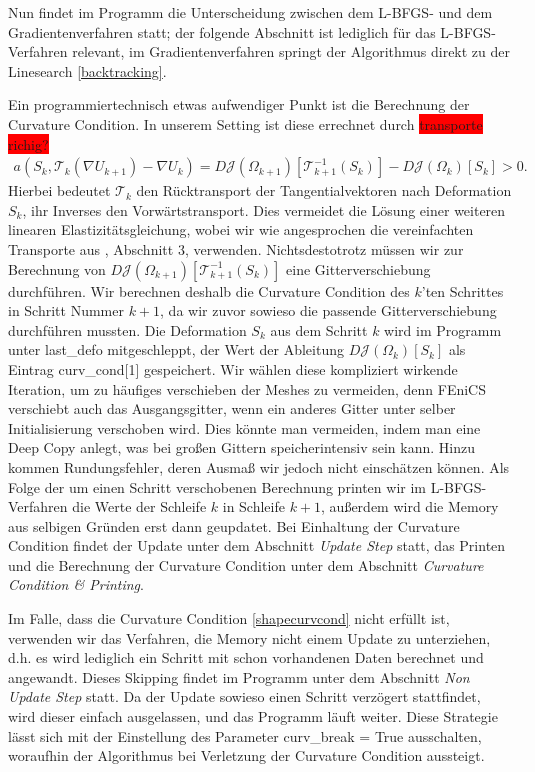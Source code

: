 Nun findet im Programm die Unterscheidung zwischen dem L-BFGS- und dem Gradientenverfahren statt; der folgende Abschnitt ist lediglich für das L-BFGS-Verfahren relevant, im Gradientenverfahren springt der Algorithmus direkt zu der Linesearch \ref{backtracking}.

Ein programmiertechnisch etwas aufwendiger Punkt ist die Berechnung der Curvature Condition. In unserem Setting ist diese errechnet durch \colorbox{red}{transporte richig?}
\begin{equation}
\label{shapecurvcond}
\begin{aligned}
	a(S_k, \mathcal{T}_k(\nabla U_{k+1}) - \nabla U_k) = D\mathcal{J}(\Omega_{k+1})[\mathcal{T}_{k+1}^{-1}(S_k)] - D\mathcal{J}(\Omega_k)[S_k] > 0.
\end{aligned}
\end{equation}
Hierbei bedeutet $\mathcal{T}_{k}$ den Rücktransport der Tangentialvektoren nach Deformation $S_k$, ihr Inverses den Vorwärtstransport. Dies vermeidet die Lösung einer weiteren linearen Elastizitätsgleichung, wobei wir wie angesprochen die vereinfachten Transporte aus \cite{diffusion}, Abschnitt 3, verwenden. Nichtsdestotrotz müssen wir zur Berechnung von $D\mathcal{J}(\Omega_{k+1})[\mathcal{T}_{k+1}^{-1}(S_k)]$ eine Gitterverschiebung durchführen. Wir berechnen deshalb die Curvature Condition des $k$'ten Schrittes in Schritt Nummer $k+1$, da wir zuvor sowieso die passende Gitterverschiebung durchführen mussten. Die Deformation $S_k$ aus dem Schritt $k$ wird im Programm unter \textsf{last\_defo} mitgeschleppt, der Wert der Ableitung $D\mathcal{J}(\Omega_k)[S_k]$ als Eintrag \textsf{curv\_cond[1]} gespeichert. Wir wählen diese kompliziert wirkende Iteration, um zu häufiges verschieben der Meshes zu vermeiden, denn FEniCS verschiebt auch das Ausgangsgitter, wenn ein anderes Gitter unter selber Initialisierung verschoben wird. Dies könnte man vermeiden, indem man eine Deep Copy anlegt, was bei großen Gittern speicherintensiv sein kann. Hinzu kommen Rundungsfehler, deren Ausmaß wir jedoch nicht einschätzen können.
Als Folge der um einen Schritt verschobenen Berechnung printen wir im L-BFGS-Verfahren die Werte der Schleife $k$ in Schleife $k+1$, außerdem wird die Memory aus selbigen Gründen erst dann geupdatet. Bei Einhaltung der Curvature Condition findet der Update unter dem Abschnitt \textit{Update Step} statt, das Printen und die Berechnung der Curvature Condition unter dem Abschnitt \textit{Curvature Condition \& Printing}. 

Im Falle, dass die Curvature Condition \ref{shapecurvcond} nicht erfüllt ist, verwenden wir das Verfahren, die Memory nicht einem Update zu unterziehen, d.h. es wird lediglich ein Schritt mit schon vorhandenen Daten berechnet und angewandt. Dieses Skipping findet im Programm unter dem Abschnitt \textit{Non Update Step} statt. Da der Update sowieso einen Schritt verzögert stattfindet, wird dieser einfach ausgelassen, und das Programm läuft weiter. Diese Strategie lässt sich mit der Einstellung des Parameter \textsf{curv\_break = True} ausschalten, woraufhin der Algorithmus bei Verletzung der Curvature Condition aussteigt.

